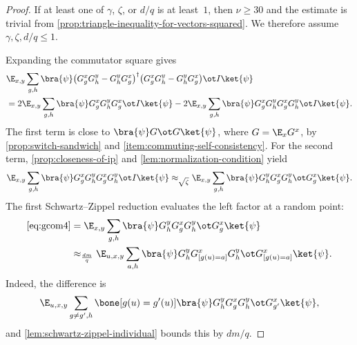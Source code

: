 \begin{proof}
	\leanok
	If at least one of $\gamma$, $\zeta$, or $d/q$ is at least~$1$, then $\nu \ge 30$ and the estimate is trivial from \ref{prop:triangle-inequality-for-vectors-squared}. We therefore assume $\gamma,\zeta,d/q \le 1$.

	Expanding the commutator square gives
	\begin{align}
		 & \E_{x,y} \sum_{g,h}
		\bra{\psi}
		\bigl(G_g^x G_h^y - G_h^y G_g^x\bigr)^\dagger
		\bigl(G_g^x G_h^y - G_h^y G_g^x\bigr)
		\ot I \ket{\psi}\nonumber  \\
		 & = 2 \E_{x,y} \sum_{g,h}
		\bra{\psi} G_g^x G_h^y G_g^x \ot I \ket{\psi}
		- 2 \E_{x,y} \sum_{g,h}
		\bra{\psi} G_g^x G_h^y G_g^x G_h^y \ot I \ket{\psi}.
		\label{eq:gcomterms}
	\end{align}
	The first term is close to $\bra{\psi} G \ot G \ket{\psi}$, where $G=\E_x G^x$, by \ref{prop:switch-sandwich} and \ref{item:commuting-self-consistency}. For the second term, \ref{prop:closeness-of-ip} and \ref{lem:normalization-condition} yield
	\begin{equation}
		\E_{x,y} \sum_{g,h}
		\bra{\psi} G_g^x G_h^y G_g^x G_h^y \ot I \ket{\psi}
		\approx_{\sqrt{\zeta}}
		\E_{x,y} \sum_{g,h}
		\bra{\psi} G_h^y G_g^x G_h^y \ot G_g^x \ket{\psi}.
		\label{eq:gcom4}
	\end{equation}
	The first Schwartz--Zippel reduction evaluates the left factor at a random point:
	\begin{align}
		\eqref{eq:gcom4}
		 & = \E_{x,y} \sum_{g,h}
		\bra{\psi} G_h^y G_g^x G_h^y \ot G_g^x \ket{\psi}\nonumber \\
		 & \approx_{\frac{dm}{q}}
		\E_{u,x,y} \sum_{a,h}
		\bra{\psi} G_h^y G^x_{[g(u)=a]} G_h^y \ot G^x_{[g(u)=a]} \ket{\psi}.
		\label{eq:evaluate-gcom-at-points}
	\end{align}
	Indeed, the difference is
	\begin{equation}\label{eq:gcom4-diff}
		\E_{u,x,y} \sum_{g \neq g',h}
		\bone[g(u)=g'(u)]
		\bra{\psi} G_h^y G_g^x G_h^y \ot G_{g'}^x \ket{\psi},
	\end{equation}
	and \ref{lem:schwartz-zippel-individual} bounds this by $dm/q$.


\end{proof}
